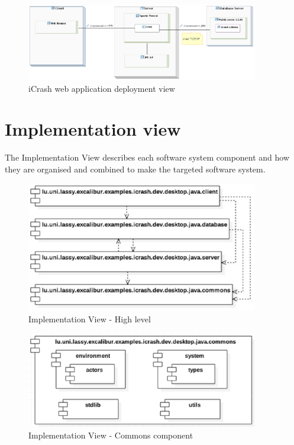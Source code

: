 \begin{figure}[H]
\begin{center}
\includegraphics[width=0.9\textwidth]{./images/depl_model_web.eps}
\end{center}
\caption{iCrash web application deployment view}
\end{figure}

\section{Implementation view}
The \gls{Implementation View} describes each software system component and how
they are organised and combined to make the targeted software system.



\begin{figure}[h!]
	\centering
	\includegraphics[width=0.9\textwidth]{./images/impl_highlevel.eps}
	\caption{Implementation View - High level}
\end{figure}

\begin{figure}[h!]
	\centering
	\includegraphics[width=0.9\textwidth]{./images/impl_commons.eps}
	\caption{Implementation View - Commons component}
\end{figure}

